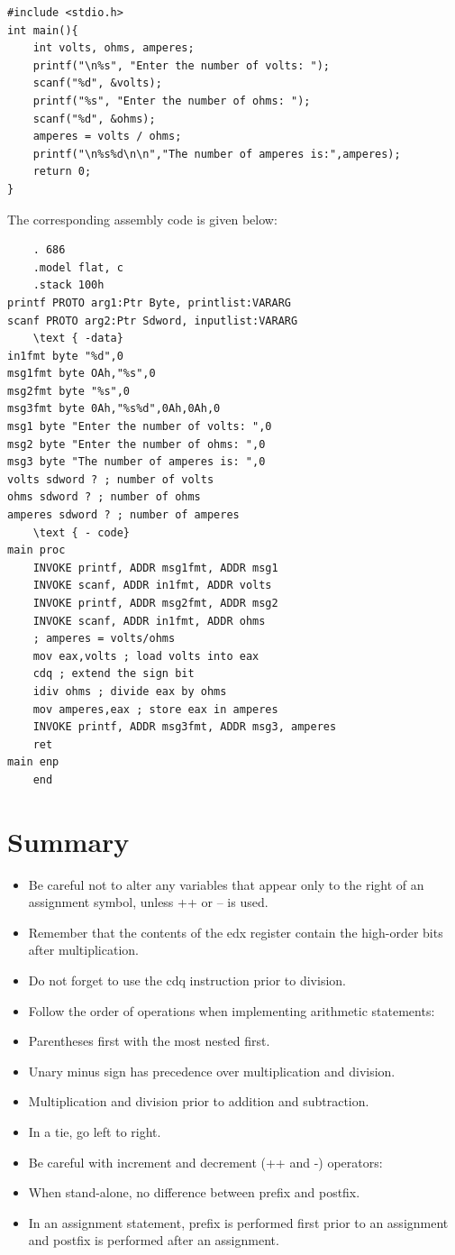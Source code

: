 \documentclass[10pt]{book}
\begin{document}
\begin{verbatim}
#include <stdio.h>
int main(){
    int volts, ohms, amperes;
    printf("\n%s", "Enter the number of volts: ");
    scanf("%d", &volts);
    printf("%s", "Enter the number of ohms: ");
    scanf("%d", &ohms);
    amperes = volts / ohms;
    printf("\n%s%d\n\n","The number of amperes is:",amperes);
    return 0;
}
\end{verbatim}

The corresponding assembly code is given below:

\begin{verbatim}
    . 686
    .model flat, c
    .stack 100h
printf PROTO arg1:Ptr Byte, printlist:VARARG
scanf PROTO arg2:Ptr Sdword, inputlist:VARARG
    \text { -data}
in1fmt byte "%d",0
msg1fmt byte OAh,"%s",0
msg2fmt byte "%s",0
msg3fmt byte 0Ah,"%s%d",0Ah,0Ah,0
msg1 byte "Enter the number of volts: ",0
msg2 byte "Enter the number of ohms: ",0
msg3 byte "The number of amperes is: ",0
volts sdword ? ; number of volts
ohms sdword ? ; number of ohms
amperes sdword ? ; number of amperes
    \text { - code}
main proc
    INVOKE printf, ADDR msg1fmt, ADDR msg1
    INVOKE scanf, ADDR in1fmt, ADDR volts
    INVOKE printf, ADDR msg2fmt, ADDR msg2
    INVOKE scanf, ADDR in1fmt, ADDR ohms
    ; amperes = volts/ohms
    mov eax,volts ; load volts into eax
    cdq ; extend the sign bit
    idiv ohms ; divide eax by ohms
    mov amperes,eax ; store eax in amperes
    INVOKE printf, ADDR msg3fmt, ADDR msg3, amperes
    ret
main enp
    end
\end{verbatim}

\section{Summary}
\begin{itemize}
  \item Be careful not to alter any variables that appear only to the right of an assignment symbol, unless ++ or -- is used.
  \item Remember that the contents of the edx register contain the high-order bits after multiplication.
  \item Do not forget to use the cdq instruction prior to division.
  \item Follow the order of operations when implementing arithmetic statements:
  \item Parentheses first with the most nested first.
  \item Unary minus sign has precedence over multiplication and division.
  \item Multiplication and division prior to addition and subtraction.
  \item In a tie, go left to right.
  \item Be careful with increment and decrement (++ and -) operators:
  \item When stand-alone, no difference between prefix and postfix.
  \item In an assignment statement, prefix is performed first prior to an assignment and postfix is performed after an assignment.
\end{itemize}
\end{document}
